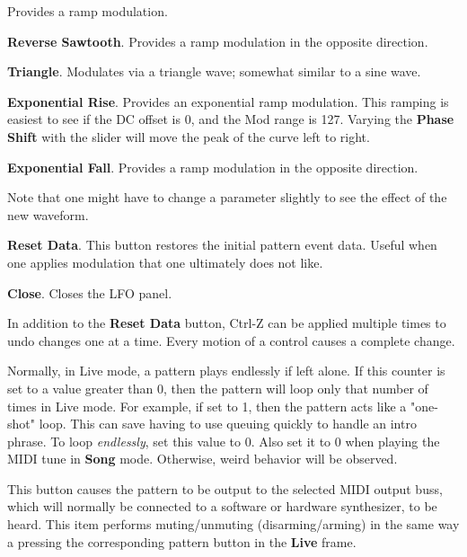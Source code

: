 \begin{enumber}
\begin{enumber}
               Provides a ramp modulation.
            \item \textbf{Reverse Sawtooth}.
               Provides a ramp modulation in the opposite direction.
            \item \textbf{Triangle}.
               Modulates via a triangle wave; somewhat similar to a sine wave.
            \item \textbf{Exponential Rise}.
               Provides an exponential ramp modulation.
               This ramping is easiest to see if the DC offset is 0,
               and the Mod range is 127.
               Varying the \textbf{Phase Shift} with the slider
               will move the peak of the curve left to right.
            \item \textbf{Exponential Fall}. Provides a ramp modulation in the
               opposite direction.
         \end{enumber}
         Note that one might have to change a parameter slightly to see the
         effect of the new waveform.
      \item \textbf{Reset Data}.
         This button restores the initial pattern event data.  Useful when one
         applies modulation that one ultimately does not like.
      \item \textbf{Close}.  Closes the LFO panel.
   \end{enumber}

   In addition to the \textbf{Reset Data} button, Ctrl-Z can be applied
   multiple times to undo changes one at a time.  Every motion of a control
   causes a complete change.

   Normally, in Live mode, a pattern plays endlessly if left alone.
   If this counter is set to a value greater than 0, then the pattern will loop
   only that number of times in Live mode.  For example, if set to 1, then the
   pattern acts like a "one-shot" loop.  This can save having to use
   queuing quickly to handle an intro phrase.
   To loop \textsl{endlessly}, set this value to 0.
   Also set it to 0 when playing the MIDI tune in \textbf{Song} mode.
   Otherwise, weird behavior will be observed.

   This button causes the pattern to be output to the
   selected MIDI output buss,
   which will normally be connected to a software or hardware
   synthesizer, to be heard.
   This item performs muting/unmuting (disarming/arming) in the same way a
   pressing the corresponding pattern button in the \textbf{Live} frame.

